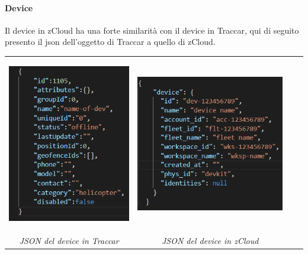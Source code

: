 \documentclass[a4paper,titlepage,12pt]{book}
\begin{document}
\paragraph{
\sffamily Device}
Il device in zCloud ha una forte similarità con il device in Traccar, qui di seguito presento il json dell'oggetto di Traccar a quello di zCloud.\\



\begin{center}

\begin{tabular}{c c c c}

    \includegraphics[scale=0.8]{images/traccDev.png}

    \label{fig:my_label}

 &  
\includegraphics[scale=0.6]{images/zClDev.png} \\
\textit{JSON del device in Traccar} &  \textit{JSON del device in zCloud}
\end{tabular}
\end{center}\par\medskip
\end{document}

